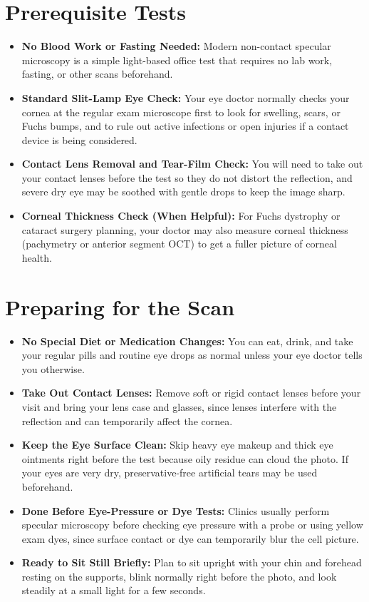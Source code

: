 \section{Prerequisite Tests}

\begin{itemize}
    \item \textbf{No Blood Work or Fasting Needed:} Modern non-contact specular microscopy is a simple light-based office test that requires no lab work, fasting, or other scans beforehand.
    \item \textbf{Standard Slit-Lamp Eye Check:} Your eye doctor normally checks your cornea at the regular exam microscope first to look for swelling, scars, or Fuchs bumps, and to rule out active infections or open injuries if a contact device is being considered.
    \item \textbf{Contact Lens Removal and Tear-Film Check:} You will need to take out your contact lenses before the test so they do not distort the reflection, and severe dry eye may be soothed with gentle drops to keep the image sharp.
    \item \textbf{Corneal Thickness Check (When Helpful):} For Fuchs dystrophy or cataract surgery planning, your doctor may also measure corneal thickness (pachymetry or anterior segment OCT) to get a fuller picture of corneal health.
\end{itemize}

\section{Preparing for the Scan}

\begin{itemize}
    \item \textbf{No Special Diet or Medication Changes:} You can eat, drink, and take your regular pills and routine eye drops as normal unless your eye doctor tells you otherwise.
    \item \textbf{Take Out Contact Lenses:} Remove soft or rigid contact lenses before your visit and bring your lens case and glasses, since lenses interfere with the reflection and can temporarily affect the cornea.
    \item \textbf{Keep the Eye Surface Clean:} Skip heavy eye makeup and thick eye ointments right before the test because oily residue can cloud the photo. If your eyes are very dry, preservative-free artificial tears may be used beforehand.
    \item \textbf{Done Before Eye-Pressure or Dye Tests:} Clinics usually perform specular microscopy before checking eye pressure with a probe or using yellow exam dyes, since surface contact or dye can temporarily blur the cell picture.
    \item \textbf{Ready to Sit Still Briefly:} Plan to sit upright with your chin and forehead resting on the supports, blink normally right before the photo, and look steadily at a small light for a few seconds.
\end{itemize}

